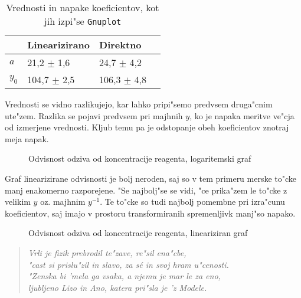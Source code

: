 \documentclass[a4paper,10pt]{article}
\begin{document}
\begin{table}
\begin{center}
  \begin{tabular}{|l|l|l|l|}
  \hline
  & Linearizirano & Direktno \\
  \hline
  $a$ & 21,2 $\pm$ 1,6 & 24,7 $\pm$ 4,2\\
  $y_0$ & 104,7 $\pm$ 2,5 & 106,3 $\pm$ 4,8\\
  \hline
\end{tabular}

\end{center}
 \label{tab:primerjava}
\caption{Vrednosti in napake koeficientov, kot jih izpi"se \texttt{Gnuplot}}
\end{table}

Vrednosti se vidno razlikujejo, kar lahko pripi"semo predvsem druga"cnim ute"zem. Razlika se pojavi predvsem pri majhnih $y$, ko je napaka meritve ve"cja od izmerjene vrednosti. Kljub temu pa je odstopanje obeh koeficientov znotraj meja napak. 

\begin{figure}
 
  \caption{Odvisnost odziva od koncentracije reagenta, logaritemski graf}
  \label{fig:receptorji-log}
\end{figure}

Graf linearizirane odvisnosti je bolj neroden, saj so v tem primeru merske to"cke manj enakomerno razporejene. "Se najbolj"se se vidi, "ce prika"zem le to"cke z velikim $y$ oz. majhnim $y^{-1}$. Te to"cke so tudi najbolj pomembne pri izra"cunu koeficientov, saj imajo v prostoru transformiranih spremenljivk manj"so napako. 

\begin{figure}
 
  \caption{Odvisnost odziva od koncentracije reagenta, lineariziran graf}
  \label{fig:receptorji-lin}
\end{figure}

\newpage

\begin{verse}
  \textit{Vrli je fizik prebrodil te"zave, re"sil ena"cbe, \\
  "cast si prislu"zil in slavo, za s\'e in svoj hram u"cenosti. \\
  "Zenska bi 'mela ga vsaka, a njemu je mar le za eno, \\
  ljubljeno Lizo in Ano, katera pri"sla je 'z Modele. }
\end{verse}
\end{document}
